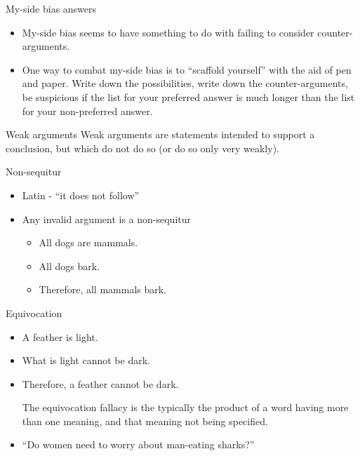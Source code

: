 \documentclass{beamer}
\begin{document}
\begin{frame}{My-side bias answers}
\begin{itemize}
\item My-side bias seems to have something to do with failing to consider counter-arguments.
\item One way to combat my-side bias is to ``scaffold yourself'' with the aid of pen and paper. Write down the possibilities, write down the counter-arguments, be suspicious if the list for your preferred answer is much longer than the list for your non-preferred answer.
\end{itemize}
\end{frame}

\begin{frame}{Weak arguments}
Weak arguments are statements intended to support a conclusion, but which do not do so (or do so only very weakly). 
\end{frame}

\begin{frame}{Non-sequitur}
\begin{itemize}
\item Latin - ``it does not follow''
\item Any invalid argument is a non-sequitur
\begin{itemize}
	\item All dogs are mammals.
	\item All dogs bark.
	\item Therefore, all mammals bark.
\end{itemize}
\end{itemize}
\end{frame}

\begin{frame}{Equivocation}
\begin{itemize}
\item A feather is light.
\item What is light cannot be dark.
\item Therefore, a feather cannot be dark.

The equivocation fallacy is the typically the product of a word having more than one meaning, and that meaning not being specified. 

\item ``Do women need to worry about man-eating sharks?''
\end{itemize}
\end{frame}
\end{document}
